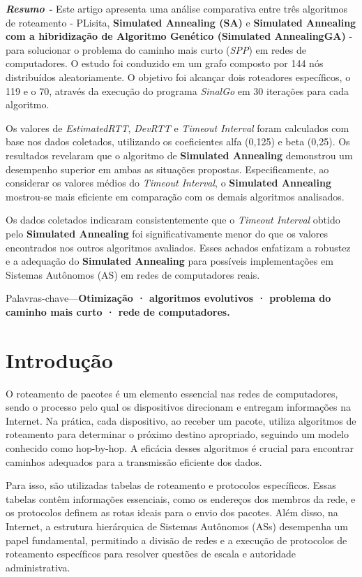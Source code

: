 \documentclass[conference]{IEEEtran}
\begin{document}
\textbf{\textit{Resumo -}} Este artigo apresenta uma análise comparativa entre três algoritmos de roteamento - PLisita, \textbf{Simulated Annealing (SA)} e \textbf{Simulated Annealing com a hibridização de Algoritmo Genético (Simulated AnnealingGA)} - para solucionar o problema do caminho mais curto (\textit{SPP}) em redes de computadores. O estudo foi conduzido em um grafo composto por 144 nós distribuídos aleatoriamente. O objetivo foi alcançar dois roteadores específicos, o 119 e o 70, através da execução do programa \textit{SinalGo} em 30 iterações para cada algoritmo.

Os valores de \textit{EstimatedRTT}, \textit{DevRTT} e \textit{Timeout Interval} foram calculados com base nos dados coletados, utilizando os coeficientes alfa (0,125) e beta (0,25). Os resultados revelaram que o algoritmo de \textbf{Simulated Annealing} demonstrou um desempenho superior em ambas as situações propostas. Especificamente, ao considerar os valores médios do \textit{Timeout Interval}, o \textbf{Simulated Annealing} mostrou-se mais eficiente em comparação com os demais algoritmos analisados.

Os dados coletados indicaram consistentemente que o \textit{Timeout Interval} obtido pelo \textbf{Simulated Annealing} foi significativamente menor do que os valores encontrados nos outros algoritmos avaliados. Esses achados enfatizam a robustez e a adequação do \textbf{Simulated Annealing} para possíveis implementações em Sistemas Autônomos (AS) em redes de computadores reais.

Palavras-chave---\textbf{Otimização · algoritmos evolutivos · problema do caminho mais curto · rede de computadores.}

\section{Introdução}
O roteamento de pacotes é um elemento essencial nas redes de computadores, sendo o processo pelo qual os dispositivos direcionam e entregam informações na Internet. Na prática, cada dispositivo, ao receber um pacote, utiliza algoritmos de roteamento para determinar o próximo destino apropriado, seguindo um modelo conhecido como hop-by-hop. A eficácia desses algoritmos é crucial para encontrar caminhos adequados para a transmissão eficiente dos dados.

Para isso, são utilizadas tabelas de roteamento e protocolos específicos. Essas tabelas contêm informações essenciais, como os endereços dos membros da rede, e os protocolos definem as rotas ideais para o envio dos pacotes. Além disso, na Internet, a estrutura hierárquica de Sistemas Autônomos (ASs) desempenha um papel fundamental, permitindo a divisão de redes e a execução de protocolos de roteamento específicos para resolver questões de escala e autoridade administrativa.
\end{document}
